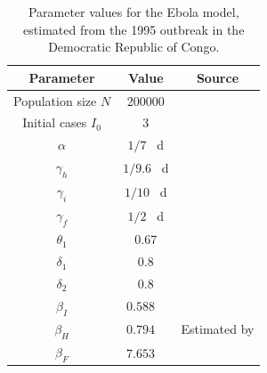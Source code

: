 \DeclareSIUnit{}
\begin{table}
	\begin{center}
		\begin{tabular}{|c|c|c|}
			\hline
			Parameter             & Value                       & Source                                                                            \\ \hline
			Population size \(N\) & 200000                                                                                                          \\
			Initial cases \(I_0\) & 3                                                                                                               \\
			\(\alpha\)            & \(1 / 7\) \unit{\per\day}                                                                                       \\
			\(\gamma_h\)          & \(1 / 9.6\) \unit{\per\day}                                                                                     \\
			\(\gamma_i\)          & \(1 / 10\) \unit{\per\day}                                                                                      \\
			\(\gamma_f\)          & \(1 / 2\) \unit{\per\day}                                                                                       \\
			\(\theta_1\)          & \(0.67\)                                                                                                        \\
			\(\delta_1\)          & \(0.8\)                                                                                                         \\
			\(\delta_2\)          & \(0.8\)                                                                                                         \\
			\(\beta_I\)           & \(0.588\) \unit{\per\week}  & \multirow{3}{*}{Estimated by \citet{LegrandEtAl_2007_UnderstandingDynamicsEbola}} \\
			\(\beta_H\)           & \(0.794\) \unit{\per\week}  &                                                                                   \\
			\(\beta_F\)           & \(7.653\) \unit{\per\week}  &                                                                                   \\
			\hline
		\end{tabular}
	\end{center}
	\caption{Parameter values for the Ebola model, estimated from the 1995 outbreak in the Democratic Republic of Congo.}
	\label{tab:ebola_param_vals}
\end{table}





